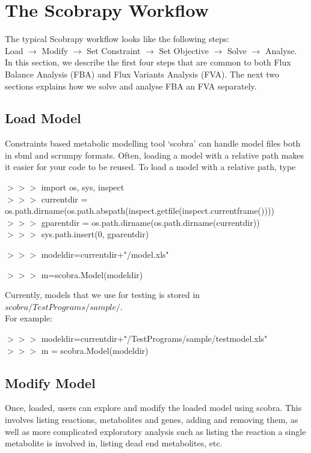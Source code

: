 \chapter{The Scobrapy Workflow}

The typical Scobrapy workflow looks like the following steps: \\ 
Load $\rightarrow$ Modify $\rightarrow$ Set Constraint $\rightarrow$ Set Objective $\rightarrow$ Solve $\rightarrow$ Analyse. \\ 

In this section, we describe the first four steps that are common to both Flux Balance Analysis (FBA) and Flux Variants Analysis (FVA). The next two sections explains how we solve and analyse FBA an FVA separately. 

\section{Load Model}
Constraints based metabolic modelling tool `scobra' can handle model files both in sbml and scrumpy formats. Often, loading a model with a relative path makes it easier for your code to be reused. To load a model with a relative path, type

\begin{framed}
$>>>$ import os, sys, inspect\\
$>>>$ currentdir = os.path.dirname(os.path.abspath(inspect.getfile(inspect.currentframe())))
$>>>$ gparentdir = os.path.dirname(os.path.dirname(currentdir))\\
$>>>$ sys.path.insert(0, gparentdir)

$>>>$ modeldir=currentdir+"/model.xls"

$>>>$ m=scobra.Model(modeldir)
\end{framed}

Currently, models that we use for testing is stored in $scobra/TestPrograms/sample/$. \\

For example:

\begin{framed}
$>>>$ modeldir=currentdir+"/TestPrograms/sample/testmodel.xls"\\
$>>>$ m = scobra.Model(modeldir) 
\end{framed}

\section{Modify Model}
Once, loaded, users can explore and modify the loaded model using scobra. This involves listing reactions, metabolites and genes, adding and removing them, as well as more complicated exploratory analysis such as listing the reaction a single metabolite is involved in, listing dead end metabolites, etc. 

